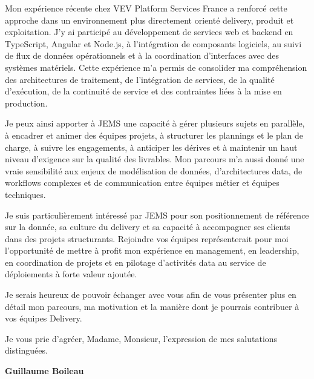 \documentclass[11pt,a4paper]{altacv}
\begin{document}
{Mon expérience récente chez VEV Platform Services France a renforcé cette approche dans un environnement plus directement orienté delivery, produit et exploitation. J'y ai participé au développement de services web et backend en TypeScript, Angular et Node.js, à l'intégration de composants logiciels, au suivi de flux de données opérationnels et à la coordination d'interfaces avec des systèmes matériels. Cette expérience m'a permis de consolider ma compréhension des architectures de traitement, de l'intégration de services, de la qualité d'exécution, de la continuité de service et des contraintes liées à la mise en production.

Je peux ainsi apporter à JEMS une capacité à gérer plusieurs sujets en parallèle, à encadrer et animer des équipes projets, à structurer les plannings et le plan de charge, à suivre les engagements, à anticiper les dérives et à maintenir un haut niveau d'exigence sur la qualité des livrables. Mon parcours m'a aussi donné une vraie sensibilité aux enjeux de modélisation de données, d'architectures data, de workflows complexes et de communication entre équipes métier et équipes techniques.

Je suis particulièrement intéressé par JEMS pour son positionnement de référence sur la donnée, sa culture du delivery et sa capacité à accompagner ses clients dans des projets structurants. Rejoindre vos équipes représenterait pour moi l'opportunité de mettre à profit mon expérience en management, en leadership, en coordination de projets et en pilotage d'activités data au service de déploiements à forte valeur ajoutée.

Je serais heureux de pouvoir échanger avec vous afin de vous présenter plus en détail mon parcours, ma motivation et la manière dont je pourrais contribuer à vos équipes Delivery.

Je vous prie d'agréer, Madame, Monsieur, l'expression de mes salutations distinguées.

\textbf{Guillaume Boileau}

}
\end{document}
